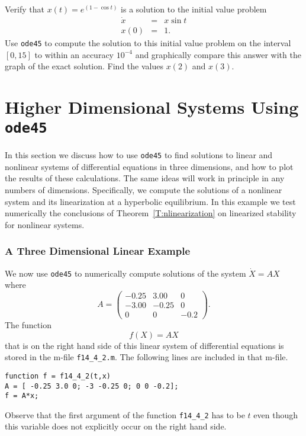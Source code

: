 \documentclass{ximera}
\begin{document}
\begin{exercise}  \label{c11.3.2B}
Verify that $x(t) = e^{(1-\cos t)}$ is a solution to the initial value problem
\[
\begin{array}{rcl}
\dot{x} & = & x\sin t \\
x(0) & = & 1.
\end{array}
\]
Use {\tt ode45} to compute the solution to this initial value problem on the
interval $[0,15]$ to within an accuracy $10^{-4}$ and graphically compare 
this answer with the graph of the exact solution.  Find the values $x(2)$ 
and $x(3)$. 
\end{exercise}



\section{Higher Dimensional Systems Using {\tt ode45}}
\label{S:ode45HD}

In this section we discuss how to use {\tt ode45} to find solutions to linear
and nonlinear systems of differential equations in three dimensions, and how 
to plot the results of these calculations.  The same ideas will work in 
principle in any numbers of dimensions.  Specifically, we compute the solutions 
of a nonlinear system and its linearization at a hyperbolic equilibrium.  In 
this example we test numerically the conclusions of 
Theorem~\ref{T:nlinearization} on linearized stability for nonlinear systems.

 
\subsubsection*{A Three Dimensional Linear Example}

We now use {\tt ode45} to numerically compute solutions of the system
$\dot{X} = AX$ where 
\begin{equation}  \label{E:3dexample}
A = \left(\begin{array}{rrr}
  -0.25 & 3.00 & 0\\
   -3.00 & -0.25 &  0\\
   0 &  0 & -0.2
\end{array}\right).
\end{equation}
The function  
\begin{equation*}
f(X) = AX
\end{equation*}
that is on the right hand side of this linear system of differential 
equations is stored in the m-file {\tt f14\_4\_2.m}.  The following lines 
are included in that m-file.
\begin{verbatim}
function f = f14_4_2(t,x)
A = [ -0.25 3.0 0; -3 -0.25 0; 0 0 -0.2];
f = A*x;
\end{verbatim}
Observe that the first argument of the function {\tt f14\_4\_2} has to be 
$t$ even though this variable does not explicitly occur on the right hand 
side.  
\end{document}
